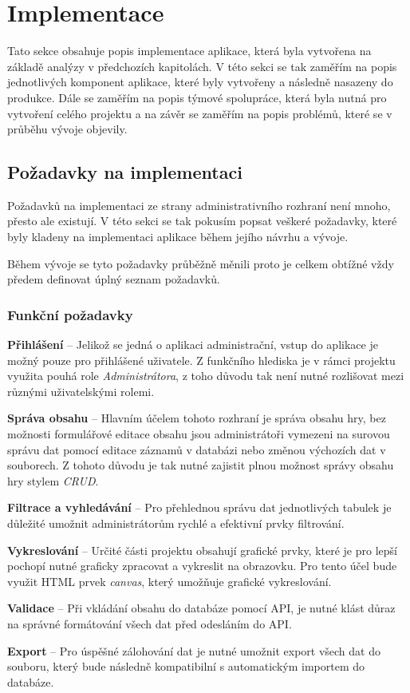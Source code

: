 \chapter{Implementace}
\label{ch:implementation}
Tato sekce obsahuje popis implementace aplikace, která byla vytvořena na základě analýzy v předchozích kapitolách. V této sekci se tak zaměřím na popis jednotlivých komponent aplikace, které byly vytvořeny a následně nasazeny do produkce. Dále se zaměřím na popis týmové spolupráce, která byla nutná pro vytvoření celého projektu a na závěr se zaměřím na popis problémů, které se v průběhu vývoje objevily.

\section{Požadavky na implementaci}
\label{sec:implementation-requirements}
Požadavků na implementaci ze strany administrativního rozhraní není mnoho, přesto ale existují. V této sekci se tak pokusím popsat veškeré požadavky, které byly kladeny na implementaci aplikace během jejího návrhu a vývoje.

Během vývoje se tyto požadavky průběžně měnili proto je celkem obtížné vždy předem definovat úplný seznam požadavků.

\subsection*{Funkční požadavky}
\label{subsec:implementation-requirements-functional}

\begin{description}
    \item \textbf{Přihlášení} -- Jelikož se jedná o aplikaci administrační, vstup do aplikace je možný pouze pro přihlášené uživatele. Z funkčního hlediska je v rámci projektu využita pouhá role \textit{Administrátora}, z toho důvodu tak není nutné rozlišovat mezi různými uživatelskými rolemi.
    \item \textbf{Správa obsahu} -- Hlavním účelem tohoto rozhraní je správa obsahu hry, bez možnosti formulářové editace obsahu jsou administrátoři vymezeni na surovou správu dat pomocí editace záznamů v databázi nebo změnou výchozích dat v souborech. Z tohoto důvodu je tak nutné zajistit plnou možnost správy obsahu hry stylem \textit{CRUD}.
    \item \textbf{Filtrace a vyhledávání} -- Pro přehlednou správu dat jednotlivých tabulek je důležité umožnit administrátorům rychlé a efektivní prvky filtrování.
    \item \textbf{Vykreslování} -- Určité části projektu obsahují grafické prvky, které je pro lepší pochopí nutné graficky zpracovat a vykreslit na obrazovku. Pro tento účel bude využit HTML prvek \textit{canvas}, který umožňuje grafické vykreslování.
    \item \textbf{Validace} -- Při vkládání obsahu do databáze pomocí API, je nutné klást důraz na správné formátování všech dat před odesláním do API\@.
    \item \textbf{Export} -- Pro úspěšné zálohování dat je nutné umožnit export všech dat do souboru, který bude následně kompatibilní s automatickým importem do databáze.
\end{description}

